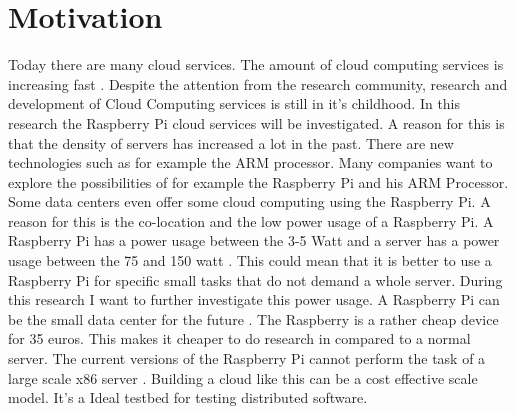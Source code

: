 \documentclass{sig-alternate-br}
\begin{document}

\section{Motivation}
Today there are many cloud services. The amount of cloud computing services is increasing fast \cite{armbrust:2009}.  Despite the attention
from the research community, research and development of
Cloud Computing services is still in it's childhood\cite{tso:2013}. 
 In this research the Raspberry Pi cloud services will be investigated. A reason for this is that the density of servers has increased a lot in the past\cite{density}. There are new technologies such as for example the ARM processor. Many companies want to explore the possibilities of for example the Raspberry Pi and his ARM Processor. Some data centers even offer some cloud computing using the Raspberry Pi. A reason for this is the co-location and the low power usage of a Raspberry Pi\cite{hosting,Pcextreme}.  A Raspberry Pi has a power usage between the 3-5 Watt and a server has a power usage between the 75 and 150 watt \cite{Powerusage}. This could mean that it is better to use a Raspberry Pi for specific small tasks that do not demand a whole server. During this research I want to further investigate this power usage.  A Raspberry Pi can be the small data center for the future \cite{tso:2013}. The Raspberry is a rather cheap device for 35 euros. This makes it cheaper to do research in compared to a normal server. The current versions of the Raspberry Pi cannot perform the task of a large scale x86 server \cite{tso:2013}. Building a cloud like this can be a cost effective scale model\cite{tso:2013}. It's a Ideal testbed for testing distributed software. 





\end{document}
